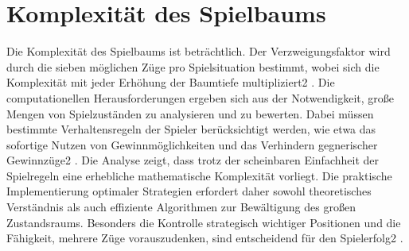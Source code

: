 \section{Komplexität des Spielbaums}
Die Komplexität des Spielbaums ist beträchtlich. Der Verzweigungsfaktor wird durch die sieben möglichen Züge pro Spielsituation bestimmt, wobei sich die Komplexität mit jeder Erhöhung der Baumtiefe multipliziert2
. Die computationellen Herausforderungen ergeben sich aus der Notwendigkeit, große Mengen von Spielzuständen zu analysieren und zu bewerten. Dabei müssen bestimmte Verhaltensregeln der Spieler berücksichtigt werden, wie etwa das sofortige Nutzen von Gewinnmöglichkeiten und das Verhindern gegnerischer Gewinnzüge2
. Die Analyse zeigt, dass trotz der scheinbaren Einfachheit der Spielregeln eine erhebliche mathematische Komplexität vorliegt. Die praktische Implementierung optimaler Strategien erfordert daher sowohl theoretisches Verständnis als auch effiziente Algorithmen zur Bewältigung des großen Zustandsraums. Besonders die Kontrolle strategisch wichtiger Positionen und die Fähigkeit, mehrere Züge vorauszudenken, sind entscheidend für den Spielerfolg2
.
	